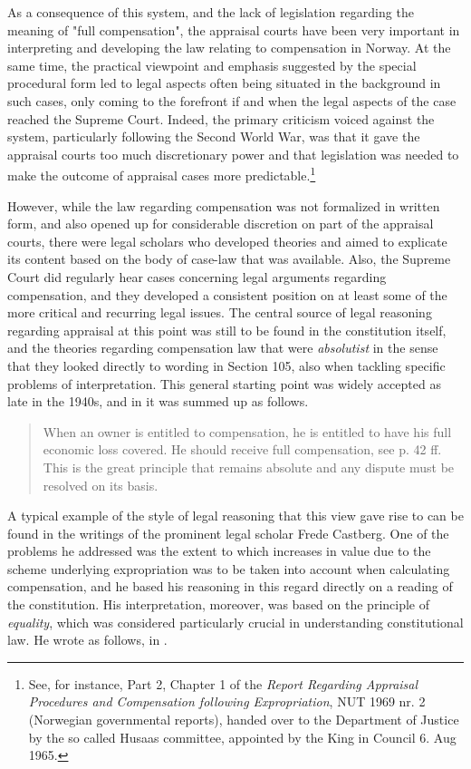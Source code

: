 As a consequence of this system, and the lack of legislation regarding the meaning of "full compensation", the appraisal courts have been very important in interpreting and developing the law relating to compensation in Norway. At the same time, the practical viewpoint and emphasis suggested by the special procedural form led to legal aspects often being situated in the background in such cases, only coming to the forefront if and when the legal aspects of the case reached the Supreme Court. Indeed, the primary criticism voiced against the system, particularly following the Second World War, was that it gave the appraisal courts too much discretionary power and that legislation was needed to make the outcome of appraisal cases more predictable.\footnote{See, for instance, Part 2, Chapter 1 of the \emph{Report Regarding Appraisal Procedures and Compensation following Expropriation}, NUT 1969 nr. 2 (Norwegian governmental reports), handed over to the Department of Justice by the so called Husaas committee, appointed by the King in Council 6. Aug 1965.}

However, while the law regarding compensation was not formalized in written form, and also opened up for considerable discretion on part of the appraisal courts, there were legal scholars who developed theories and aimed to explicate its content based on the body of case-law that was available. Also, the Supreme Court did regularly hear cases concerning legal arguments regarding compensation, and they developed a consistent position on at least some of the more critical and recurring legal issues. The central source of legal reasoning regarding appraisal at this point was still to be found in the constitution itself, and the theories regarding compensation law that were \emph{absolutist} in the sense that they looked directly to wording in Section 105, also when tackling specific problems of interpretation. This general starting point was widely accepted as late in the 1940s, and in \cite[p. 177]{schj} it was summed up as follows.

\begin{quote}
When an owner is entitled to compensation, he is entitled to have his full economic loss covered. He should receive full compensation, see p. 42 ff. This is the great principle that remains absolute and any dispute must be resolved on its basis.
\end{quote}

A typical example of the style of legal reasoning that this view gave rise to can be found in the writings of the prominent legal scholar Frede Castberg. One of the problems he addressed was the extent to which increases in value due to the scheme underlying expropriation was to be taken into account when calculating compensation, and he based his reasoning in this regard directly on a reading of the constitution. His interpretation, moreover, was based on the principle of \emph{equality}, which was considered particularly crucial in understanding constitutional law. He wrote as follows, in \cite[Volume 2, p. 268]{castberg}.

